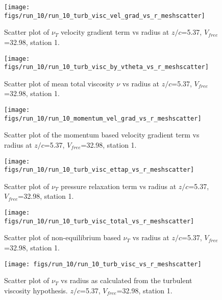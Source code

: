 \begin{figure}[H]
\centering
\texttt{[image: figs/run\_10/run\_10\_turb\_visc\_vel\_grad\_vs\_r\_meshscatter]}
\caption{Scatter plot of $\nu_T$ velocity gradient term vs radius at $z/c$=5.37, $V_{free}$=32.98, station 1.}
\end{figure}


\begin{figure}[H]
\centering
\texttt{[image: figs/run\_10/run\_10\_turb\_visc\_by\_vtheta\_vs\_r\_meshscatter]}
\caption{Scatter plot of mean total viscosity $\nu$ vs radius at $z/c$=5.37, $V_{free}$=32.98, station 1.}
\end{figure}


\begin{figure}[H]
\centering
\texttt{[image: figs/run\_10/run\_10\_momentum\_vel\_grad\_vs\_r\_meshscatter]}
\caption{Scatter plot of the momentum based velocity gradient term vs radius at $z/c$=5.37, $V_{free}$=32.98, station 1.}
\end{figure}


\begin{figure}[H]
\centering
\texttt{[image: figs/run\_10/run\_10\_turb\_visc\_ettap\_vs\_r\_meshscatter]}
\caption{Scatter plot of $\nu_T$ pressure relaxation term vs radius at $z/c$=5.37, $V_{free}$=32.98, station 1.}
\end{figure}


\begin{figure}[H]
\centering
\texttt{[image: figs/run\_10/run\_10\_turb\_visc\_total\_vs\_r\_meshscatter]}
\caption{Scatter plot of non-equilibrium based $\nu_T$ vs radius at $z/c$=5.37, $V_{free}$=32.98, station 1.}
\end{figure}


\begin{figure}[H]
\centering
\texttt{[image: figs/run\_10/run\_10\_turb\_visc\_vs\_r\_meshscatter]}
\caption{Scatter plot of $\nu_T$ vs radius as calculated from the turbulent viscosity hypothesis. $z/c$=5.37, $V_{free}$=32.98, station 1.}
\end{figure}



